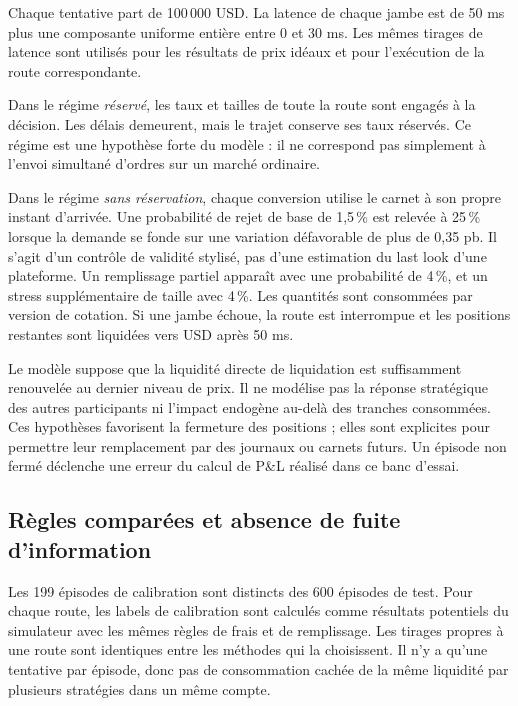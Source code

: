 Chaque tentative part de 100\,000 USD. La latence de chaque jambe est de 50 ms plus une composante uniforme entière entre 0 et 30 ms. Les mêmes tirages de latence sont utilisés pour les résultats de prix idéaux et pour l'exécution de la route correspondante.

Dans le régime \emph{réservé}, les taux et tailles de toute la route sont engagés à la décision. Les délais demeurent, mais le trajet conserve ses taux réservés. Ce régime est une hypothèse forte du modèle : il ne correspond pas simplement à l'envoi simultané d'ordres sur un marché ordinaire.

Dans le régime \emph{sans réservation}, chaque conversion utilise le carnet à son propre instant d'arrivée. Une probabilité de rejet de base de 1,5\,\% est relevée à 25\,\% lorsque la demande se fonde sur une variation défavorable de plus de 0,35 pb. Il s'agit d'un contrôle de validité stylisé, pas d'une estimation du last look d'une plateforme. Un remplissage partiel apparaît avec une probabilité de 4\,\%, et un stress supplémentaire de taille avec 4\,\%. Les quantités sont consommées par version de cotation. Si une jambe échoue, la route est interrompue et les positions restantes sont liquidées vers USD après 50 ms.

Le modèle suppose que la liquidité directe de liquidation est suffisamment renouvelée au dernier niveau de prix. Il ne modélise pas la réponse stratégique des autres participants ni l'impact endogène au-delà des tranches consommées. Ces hypothèses favorisent la fermeture des positions ; elles sont explicites pour permettre leur remplacement par des journaux ou carnets futurs. Un épisode non fermé déclenche une erreur du calcul de P\&L réalisé dans ce banc d'essai.

\subsection{Règles comparées et absence de fuite d'information}

Les 199 épisodes de calibration sont distincts des 600 épisodes de test. Pour chaque route, les labels de calibration sont calculés comme résultats potentiels du simulateur avec les mêmes règles de frais et de remplissage. Les tirages propres à une route sont identiques entre les méthodes qui la choisissent. Il n'y a qu'une tentative par épisode, donc pas de consommation cachée de la même liquidité par plusieurs stratégies dans un même compte.

